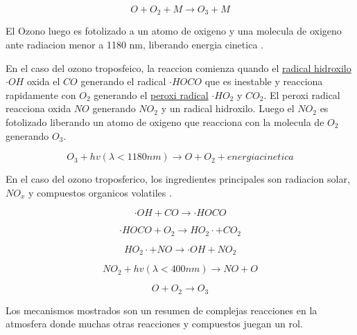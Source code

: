 \documentclass[]{book}
\begin{document}
\begin{equation}
O + O_2 + M     \rightarrow O_3 + M 
\label{eq:2}
\end{equation}

El Ozono luego es fotolizado a un atomo de oxigeno y una molecula de oxigeno ante radiacion menor a 1180 nm, liberando energia cinetica \citep{o3}.

En el caso del ozono troposfeico, la reaccion comienza quando el \href{https://en.wikipedia.org/wiki/Hydroxyl_radical}{radical hidroxilo} \(\cdot OH\) oxida el \(CO\) generando el radical \(\cdot HOCO\) que es inestable y reacciona rapidamente con \(O_2\) generando el \href{https://en.wikipedia.org/wiki/Hydroperoxyl}{peroxi radical} \(\cdot HO_2\) y \(CO_2\). El peroxi radical reacciona oxida \(NO\) generando \(NO_2\) y un radical hidroxilo. Luego el \(NO_2\) es fotolizado liberando un atomo de oxigeno que reacciona con la molecula de \(O_2\) generando \(O_3\).

\begin{equation}
O_3 + hv(\lambda < 1180 nm)     \rightarrow O + O_2 + energia cinetica 
\label{eq:3}
\end{equation}

En el caso del ozono troposferico, los ingredientes principales son radiacion solar, \(NO_x\) y compuestos organicos volatiles \citep{o3wiki}.

\begin{equation}
\cdot OH + CO   \rightarrow \cdot HOCO
\label{eq:4}
\end{equation}

\begin{equation}
\cdot HOCO + O_2    \rightarrow HO_2\cdot + CO_2
\label{eq:5}
\end{equation}

\begin{equation}
HO_2\cdot + NO  \rightarrow \cdot OH + NO_2
\label{eq:6}
\end{equation}

\begin{equation}
NO_2 + hv(\lambda < 400nm)  \rightarrow NO + O
\label{eq:7}
\end{equation}

\begin{equation}
O + O_2     \rightarrow O_3
\label{eq:8}
\end{equation}

Los mecanismos mostrados son un resumen de complejas reacciones en la atmosfera donde muchas otras reacciones y compuestos juegan un rol.
\end{document}
